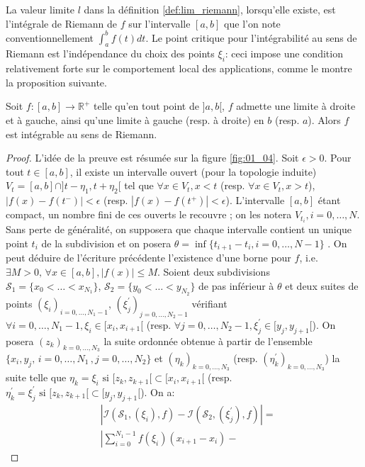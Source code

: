 La valeur limite $l$ dans la définition \ref{def:lim_riemann}, lorsqu'elle
existe, est l'intégrale de Riemann de $f$ sur l'intervalle $[a,b]$ que l'on note
conventionnellement $\int_a^b f(t)dt$. Le point critique pour l'intégrabilité au
sens de Riemann est l'indépendance du choix des points $\xi_i$:
ceci impose une condition relativement forte sur le comportement local des
applications, comme le montre la proposition suivante.
\begin{prop} 
Soit $f \colon [a,b] \to \mathbb{R}^+$ telle qu'en tout
point de $]a,b[$, $f$ admette une limite à droite et à gauche, ainsi qu'une
limite à gauche (resp. à droite) en $b$ (resp. $a$). Alors $f$ est intégrable au
sens de Riemann.
 \end{prop}
 \begin{proof}
 L'idée de la preuve est résumée sur la figure \ref{fig:01_04}. Soit
 $\epsilon > 0$. Pour tout $t \in [a,b]$, il existe un intervalle ouvert
 (pour la topologie induite) $V_t = [a,b] \cap ]t-\eta_1, t+\eta_2[$  tel que
 $\forall x \in V_t, x < t$ (resp. $\forall x \in V_t, x > t$), $|f(x)
 -f(t^-)|<\epsilon$ (resp. $|f(x)-f(t^+)|<\epsilon$). L'intervalle $[a,b]$ étant compact, 
 un nombre fini de ces ouverts le recouvre ; on les notera $V_{t_i}, i = 0,
 \dots, N$.  Sans perte de généralité, on supposera que chaque intervalle
 contient un unique point $t_i$ de la subdivision et on posera $\theta = \inf \{
 t_{i+1}-t_i, i=0, \dots, N-1 \}$ . On peut déduire de l'écriture précédente l'existence d'une borne pour $f$, i.e. $\exists M >0, \, \forall x \in [a,b],
 |f(x)|\leq M$. Soient deux subdivisions $\mathcal{S}_1=\{x_0 < \dots <
 x_{N_1}\}$, $\mathcal{S}_2 = \{ y_0 < \dots < y_{N_2} \}$ de pas inférieur à
 $\theta$ et deux suites de points $(\xi_i)_{i=0, \dots, N_1 -1}$,
 $(\xi_j^\prime)_{j=0, \dots, N_2-1}$ vérifiant $\forall i=0, \dots, N_1-1,
 \xi_i \in [x_i, x_{i+1}[$ (resp. $\forall j=0, \dots, N_2-1,
 \xi_j^\prime \in [y_j, y_{j+1}[$). On posera $(z_k)_{k=0, \dots, N_3}$ la
 suite ordonnée obtenue à partir de l'ensemble $\{x_i,y_j, \,
 i=0,\dots,N_1 \,,  j=0, \dots, N_2 \}$ et $(\eta_k)_{k=0,\dots,N_3}$ (resp.
 $(\eta_k^\prime)_{k=0,\dots,N_3}$) la suite telle que $\eta_k = \xi_i \text{ si
 } [z_k, z_{k+1}[ \subset [x_i, x_{i+1}[$ (resp. $\eta_k^\prime = \xi_j^\prime
 \text{ si } [z_k, z_{k+1}[ \subset [y_j, y_{j+1}[$).
 On a:
 \begin{align*}
  & |\mathcal{I}(\mathcal{S}_1, (\xi_i), f) -\mathcal{I}(\mathcal{S}_2,
 (\xi^\prime_j), f)| = \\
 & \left|\sum_{i=0}^{N_1-1} f(\xi_i)(x_{i+1}-x_i) -

\end{align*}
\end{proof}
